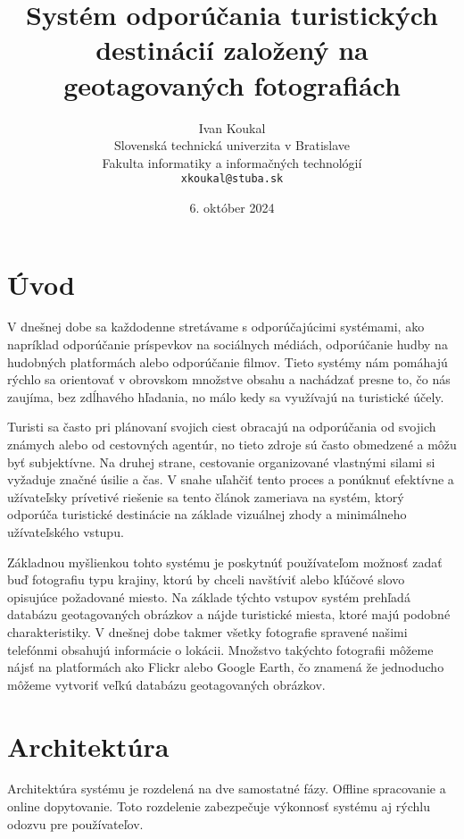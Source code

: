 \documentclass[10pt,twoside,slovak,a4paper]{article}
\title{Systém odporúčania turistických destinácií založený na geotagovaných fotografiách} %
\author{Ivan Koukal\\[2pt]
	{\small Slovenská technická univerzita v Bratislave}\\
	{\small Fakulta informatiky a informačných technológií}\\
	{\small \texttt{xkoukal@stuba.sk}}
	}
\date{\small 6. október 2024}
\begin{document}
\maketitle

\section{Úvod}

V dnešnej dobe sa každodenne stretávame s odporúčajúcimi systémami, ako napríklad odporúčanie príspevkov na sociálnych médiách, odporúčanie hudby na hudobných platformách alebo odporúčanie filmov. Tieto systémy nám pomáhajú rýchlo sa orientovať v obrovskom množstve obsahu a nachádzať presne to, čo nás zaujíma, bez zdĺhavého hľadania, no málo kedy sa využívajú na turistické účely.


Turisti sa často pri plánovaní svojich ciest obracajú na odporúčania od svojich známych alebo od cestovných agentúr, no tieto zdroje sú často obmedzené a môžu byť subjektívne. Na druhej strane, cestovanie organizované vlastnými silami si vyžaduje značné úsilie a čas. V snahe uľahčiť tento proces a ponúknuť efektívne a užívateľsky prívetivé riešenie sa tento článok zameriava na systém, ktorý odporúča turistické destinácie na základe vizuálnej zhody a minimálneho užívateľského vstupu.


Základnou myšlienkou tohto systému je poskytnúť používateľom možnosť zadať buď fotografiu typu krajiny, ktorú by chceli navštíviť alebo kľúčové slovo opisujúce požadované miesto. Na základe týchto vstupov systém prehľadá databázu geotagovaných obrázkov a nájde turistické miesta, ktoré majú podobné charakteristiky. V dnešnej dobe takmer všetky fotografie spravené našimi telefónmi obsahujú informácie o lokácii. Množstvo takýchto fotografii môžeme nájsť na platformách ako Flickr alebo Google Earth,  čo znamená že jednoducho môžeme vytvoriť veľkú databázu geotagovaných obrázkov. 

\newpage

\section{Architektúra}

Architektúra systému je rozdelená na dve samostatné fázy. Offline spracovanie a online dopytovanie. Toto rozdelenie zabezpečuje výkonnosť systému aj rýchlu odozvu pre používateľov.
\end{document}
